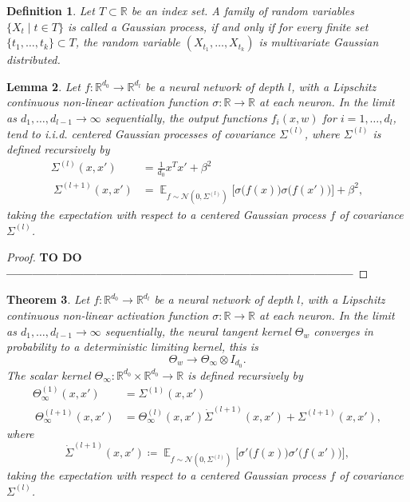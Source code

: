 \documentclass[11pt, a4paper]{article}
\newtheorem{theorem}{Theorem}[section]
\newtheorem{lemma}[theorem]{Lemma}
\newtheorem{definition}[theorem]{Definition}
\newcommand{\R}{\mathds{R}}
\DeclareMathOperator*{\E}{\mathds{E}}
\begin{document}
\begin{definition}
Let $T \subset \R$ be an index set. A family of random variables $\{ X_t \mid t \in T \}$ is called a Gaussian process, if and only if for every finite set $\{ t_1, \dots, t_k \} \subset T$, the random variable $(X_{t_1}, \dots, X_{t_k})$ is multivariate Gaussian distributed.
\end{definition}

\begin{lemma}
Let $f: \R^{d_0} \to \R^{d_l}$ be a neural network of depth $l$, with a Lipschitz continuous non-linear activation function $\sigma: \R \to \R$ at each neuron. In the limit as $d_1, \dots, d_{l-1} \to \infty$ sequentially, the output functions $f_i(x,w)$ for $i=1, \dots, d_l$, tend to i.i.d. centered Gaussian processes of covariance $\Sigma^{(l)}$, where $\Sigma^{(l)}$ is defined recursively by
\[ \begin{split}
\Sigma^{(l)}(x,x') &= \frac{1}{d_0} x^Tx' + \beta^2 \\\
\Sigma^{(l+1)}(x,x') &= \E_{f \sim \mathcal{N}(0, \Sigma^{(l)})} \Big [ \sigma \big ( f(x) \big ) \sigma \big ( f(x') \big) \Big ] + \beta^2,
\end{split} \]
taking the expectation with respect to a centered Gaussian process $f$ of covariance $\Sigma^{(l)}$.
\end{lemma}

\begin{proof}
\textbf{TO DO ---------------------------------------------------------------------------------}
\end{proof}

\begin{theorem}
Let $f: \R^{d_0} \to \R^{d_l}$ be a neural network of depth $l$, with a Lipschitz continuous non-linear activation function $\sigma: \R \to \R$ at each neuron. In the limit as $d_1, \dots, d_{l-1} \to \infty$ sequentially, the neural tangent kernel $\Theta_w$ converges in probability to a deterministic limiting kernel, this is
\[ \Theta_w \to \Theta_{\infty} \otimes I_{d_0}. \]
The scalar kernel $\Theta_{\infty} : \R^{d_0} \times \R^{d_0} \to \R$ is defined recursively by
\[ \begin{split} 
\Theta_{\infty}^{(1)} (x,x') &= \Sigma^{(1)}(x,x') \\\
\Theta_{\infty}^{(l+1)}(x,x') &= \Theta_{\infty}^{(l)}(x,x') \dot{\Sigma}^{(l+1)}(x,x') + \Sigma^{(l+1)}(x,x'),
\end{split} \]
where 
\[ \dot{\Sigma}^{(l+1)}(x,x') \coloneq \E_{f \sim \mathcal{N}(0, \Sigma^{(l)})} \Big [ \sigma' \big ( f(x) \big ) \sigma' \big ( f(x') \big) \Big ], \]
taking the expectation with respect to a centered Gaussian process $f$ of covariance $\Sigma^{(l)}$.
\end{theorem}
\end{document}

